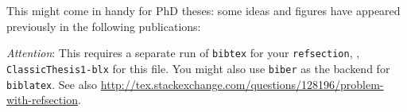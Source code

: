 \chapter*{}
This might come in handy for PhD theses: some ideas and figures have appeared previously in the following publications:


\begin{refsection}[ownpubs]
    \small
    \nocite{*} %
    \printbibliography[heading=none]
\end{refsection}

\emph{Attention}: This requires a separate run of \texttt{bibtex} for your \texttt{refsection}, \eg, \texttt{ClassicThesis1-blx} for this file. You might also use \texttt{biber} as the backend for \texttt{biblatex}. See also \url{http://tex.stackexchange.com/questions/128196/problem-with-refsection}.

